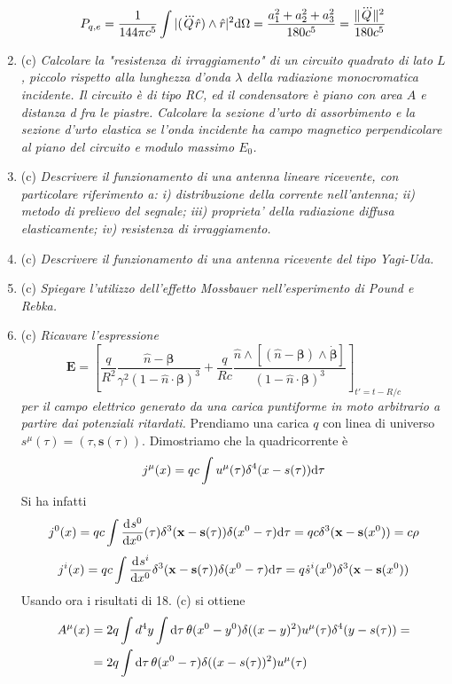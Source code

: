 \documentclass{article}
\renewcommand{\c}{(c)}
\renewcommand{\t}[1]{\textit{ #1}}
\renewcommand{\vec}[1]{\mathbf{#1}}
\begin{document}
\begin{enumerate}
	\[P_{q,e}=\frac{1}{144\pi c^5}\int|(\dddot{Q}\hat{r})\wedge\hat{r}|^2\mathrm{d}\Omega=\frac{a_1^2+a_2^2+a_3^2}{180c^5}=\frac{\Vert \dddot{Q}\Vert^2}{180c^5}\]
	\item\c\t{Calcolare la "resistenza di irraggiamento" di un circuito quadrato di lato $L$,
		piccolo rispetto alla lunghezza d'onda $\lambda$ della radiazione monocromatica
		incidente. Il circuito è di tipo RC, ed il condensatore è piano con area $A$ e
		distanza d fra le piastre. Calcolare la sezione d'urto di assorbimento e la sezione
		d'urto elastica se l'onda incidente ha campo magnetico perpendicolare al piano del
		circuito e modulo massimo $E_0$.}
	\item\c\t{Descrivere il funzionamento di una antenna lineare ricevente, con particolare
		riferimento a: i) distribuzione della corrente nell'antenna; ii) metodo di prelievo
		del segnale; iii) proprieta' della radiazione diffusa elasticamente; iv) resistenza di
		irraggiamento.}
	\item\c\t{Descrivere il funzionamento di una antenna ricevente del tipo Yagi-Uda.}
	\item\c\t{Spiegare l'utilizzo dell'effetto Mossbauer nell'esperimento di Pound e Rebka.}
	\item\c\t{Ricavare l’espressione\[\vec{E}=\left[\frac{q}{R^2}\frac{\hat{n}-\bm{\beta}}{\gamma^2(1-\hat{n}\cdot\bm{\beta})^3}+\frac{q}{Rc}\frac{\hat{n}\wedge[(\hat{n}-\bm{\beta})\wedge\dot{\bm{\beta}}]}{(1-\hat{n}\cdot\bm{\beta})^3}\right]_{t'=t-R/c}\]	
		per il campo elettrico
		generato da una carica puntiforme in moto arbitrario a partire dai potenziali
		ritardati.} Prendiamo una carica $q$ con linea di universo $s^\mu(\tau)=(\tau,\vec{s}(\tau))$. Dimostriamo che la quadricorrente è
	\[j^\mu(x)=qc\int u^\mu(\tau)\delta^4(x-s(\tau))\mathrm{d} \tau\]
	Si ha infatti
	\[j^0(x)=qc\int\der{s^0}{x^0}(\tau)\delta^3(\vec{x}-\vec{s}(\tau))\delta(x^0-\tau)\d \tau=qc\delta^3(\vec{x}-\vec{s}(x^0))=c\rho\]
	\[j^i(x)=qc\int\der{s^i}{x^0}\delta^3(\vec{x}-\vec{s}(\tau))\delta(x^0-\tau)\d \tau=q\dot{s}^i(x^0)\delta^3(\vec{x}-\vec{s}(x^0))\]
	Usando ora i risultati di 18. \c \textrm{ }si ottiene
	\begin{align*}A^\mu(x)&=2q\int d^4 y\int \mathrm{d}\tau\,\theta(x^0-y^0)\delta((x-y)^2)u^\mu(\tau)\delta^4(y-s(\tau))=\\&=2q\int\mathrm{d} \tau\,\theta(x^0-\tau)\delta((x-s(\tau))^2)u^\mu(\tau)\end{align*}

\end{enumerate}
\end{document}
